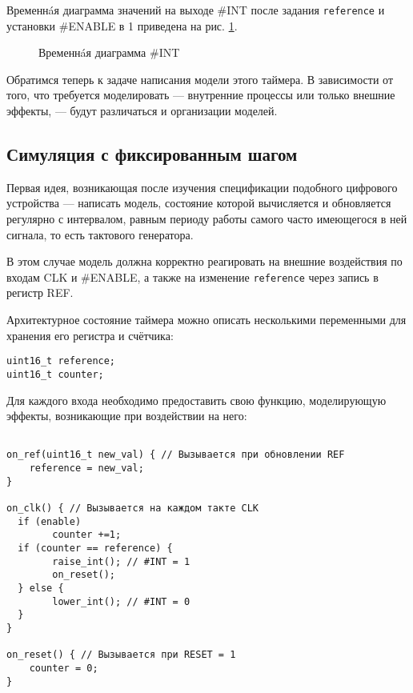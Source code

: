 Временнáя диаграмма значений на выходе \#INT после задания \texttt{reference} и установки \#ENABLE в 1 приведена на рис. \ref{fig:timer-diagram}.

\begin{figure}[htp]
    \centering
    \caption[Временнáя диаграмма \#INT]{Временнáя диаграмма \#INT}
    \label{fig:timer-diagram}
\end{figure}

Обратимся теперь к задаче написания модели этого таймера. В зависимости от того, что требуется моделировать — внутренние процессы или только внешние эффекты, — будут различаться и организации моделей.

\subsection{Симуляция с фиксированным шагом}\label{sec:time-stepped}

Первая идея, возникающая после изучения спецификации подобного цифрового устройства — написать модель, состояние которой вычисляется и обновляется регулярно с интервалом, равным периоду работы самого часто имеющегося в ней сигнала, то есть тактового генератора.

В этом случае модель должна корректно реагировать на внешние воздействия по входам CLK и \#ENABLE, а также на изменение \texttt{reference} через запись в регистр REF.

Архитектурное состояние таймера можно описать несколькими переменными для хранения его регистра и счётчика:

\begin{lstlisting}
uint16_t reference;
uint16_t counter;
\end{lstlisting}

Для каждого входа необходимо предоставить свою функцию, моделирующую эффекты, возникающие при воздействии на него:

\begin{lstlisting}

on_ref(uint16_t new_val) { // Вызывается при обновлении REF
    reference = new_val;
}

on_clk() { // Вызывается на каждом такте CLK
  if (enable)
        counter +=1;
  if (counter == reference) {
        raise_int(); // #INT = 1
        on_reset();
  } else {
        lower_int(); // #INT = 0
  }
}

on_reset() { // Вызывается при RESET = 1
    counter = 0;
}
\end{lstlisting}


